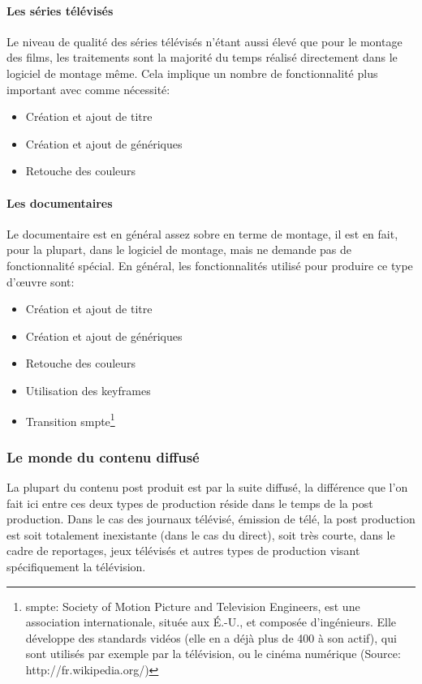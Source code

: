 
\paragraph {Les séries télévisés}
Le niveau de qualité des séries télévisés n'étant aussi élevé que pour
le montage des films, les traitements sont la majorité du temps réalisé
directement dans le logiciel de montage même. Cela implique un nombre de
fonctionnalité plus important avec comme nécessité:
\begin{itemize}
  \item{Création et ajout de titre}
  \item{Création et ajout de génériques}
  \item{Retouche des couleurs}
\end{itemize}

\paragraph {Les documentaires}
Le documentaire est en général assez sobre en terme de montage, il est en
fait, pour la plupart, dans le logiciel de montage, mais ne demande pas
de fonctionnalité spécial. En général, les fonctionnalités utilisé
pour produire ce type d'œuvre sont:
\begin{itemize}
  \item{Création et ajout de titre}
  \item{Création et ajout de génériques}
  \item{Retouche des couleurs}
  \item{Utilisation des keyframes}
  \item{Transition smpte\footnote{smpte: Society of Motion Picture
    and Television Engineers, est une association internationale,
    située aux É.-U., et composée d'ingénieurs. Elle développe
    des standards vidéos (elle en a déjà plus de 400 à son actif),
    qui sont utilisés par exemple par la télévision, ou le cinéma numérique
    (Source: http://fr.wikipedia.org/)}}
\end{itemize}

\subsubsection{Le monde du contenu diffusé}

La plupart du contenu post produit est par la suite diffusé, la différence que l'on
fait ici entre ces deux types de production réside dans le temps de la post production.
Dans le cas des journaux télévisé, émission de télé, la post production est soit totalement
inexistante (dans le cas du direct), soit très courte, dans le cadre de reportages, jeux télévisés
et autres types de production visant spécifiquement la télévision.

